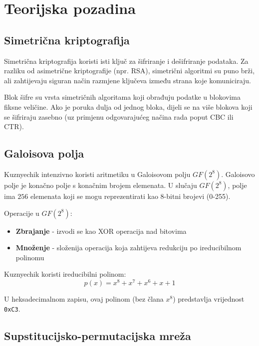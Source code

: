 \documentclass[12pt,a4paper]{article}
\begin{document}
\newpage
\section{Teorijska pozadina}

\subsection{Simetrična kriptografija}

Simetrična kriptografija koristi isti ključ za šifriranje i dešifriranje podataka. Za razliku od asimetrične kriptografije (npr. RSA), simetrični algoritmi su puno brži, ali zahtijevaju siguran način razmjene ključeva između strana koje komuniciraju.

Blok šifre su vrsta simetričnih algoritama koji obrađuju podatke u blokovima fiksne veličine. Ako je poruka dulja od jednog bloka, dijeli se na više blokova koji se šifriraju zasebno (uz primjenu odgovarajućeg načina rada poput CBC ili CTR).

\subsection{Galoisova polja}

Kuznyechik intenzivno koristi aritmetiku u Galoisovom polju $GF(2^8)$. Galoisovo polje je konačno polje s konačnim brojem elemenata. U slučaju $GF(2^8)$, polje ima $256$ elemenata koji se mogu reprezentirati kao 8-bitni brojevi (0-255).

Operacije u $GF(2^8)$:
\begin{itemize}
    \item \textbf{Zbrajanje} - izvodi se kao XOR operacija nad bitovima
    \item \textbf{Množenje} - složenija operacija koja zahtijeva redukciju po ireducibilnom polinomu
\end{itemize}

Kuznyechik koristi ireducibilni polinom:
\begin{equation}
    p(x) = x^8 + x^7 + x^6 + x + 1
\end{equation}

U heksadecimalnom zapisu, ovaj polinom (bez člana $x^8$) predstavlja vrijednost \texttt{0xC3}.

\subsection{Supstitucijsko-permutacijska mreža}
\end{document}
